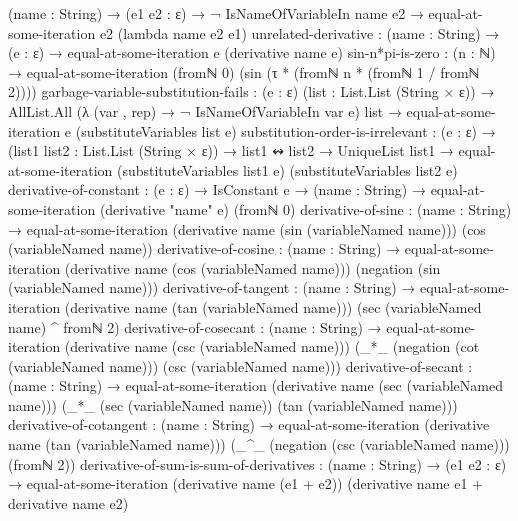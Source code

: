 \documentclass{report}
\begin{document}
\begin{code}
      (name : String) →
      (e1 e2 : ε) →
      ¬ IsNameOfVariableIn name e2 →
      equal-at-some-iteration e2 (lambda name e2 e1)
    unrelated-derivative :
      (name : String) →
      (e : ε) →
      equal-at-some-iteration e (derivative name e)
    sin-n*pi-is-zero :
      (n : ℕ) →
      equal-at-some-iteration (fromℕ 0)
                              (sin (τ * (fromℕ n * (fromℕ 1 / fromℕ 2))))
    garbage-variable-substitution-fails :
      (e : ε)
      (list : List.List (String × ε)) →
      AllList.All (λ (var , rep) → ¬ IsNameOfVariableIn var e)
                  list →
      equal-at-some-iteration e (substituteVariables list e)
    substitution-order-is-irrelevant :
      (e : ε) →
      (list1 list2 : List.List (String × ε)) →
      list1 ↭ list2 →
      UniqueList list1 →
      equal-at-some-iteration (substituteVariables list1 e)
                              (substituteVariables list2 e)
    derivative-of-constant :
      (e : ε) →
      IsConstant e →
      (name : String) →
      equal-at-some-iteration (derivative "name" e) (fromℕ 0)
    derivative-of-sine :
      (name : String) →
      equal-at-some-iteration (derivative name (sin (variableNamed name)))
                              (cos (variableNamed name))
    derivative-of-cosine :
      (name : String) →
      equal-at-some-iteration (derivative name (cos (variableNamed name)))
                              (negation (sin (variableNamed name)))
    derivative-of-tangent :
      (name : String) →
      equal-at-some-iteration (derivative name (tan (variableNamed name)))
                              (sec (variableNamed name) ^ fromℕ 2)
    derivative-of-cosecant :
      (name : String) →
      equal-at-some-iteration (derivative name (csc (variableNamed name)))
                              (_*_ (negation (cot (variableNamed name)))
                                   (csc (variableNamed name)))
    derivative-of-secant :
      (name : String) →
      equal-at-some-iteration (derivative name (sec (variableNamed name)))
                              (_*_ (sec (variableNamed name))
                                   (tan (variableNamed name)))
    derivative-of-cotangent :
      (name : String) →
      equal-at-some-iteration (derivative name (tan (variableNamed name)))
                              (_^_ (negation (csc (variableNamed name)))
                                   (fromℕ 2))
    derivative-of-sum-is-sum-of-derivatives :
      (name : String) →
      (e1 e2 : ε) →
      equal-at-some-iteration (derivative name (e1 + e2))
                              (derivative name e1 + derivative name e2)
\end{code}
\end{document}
